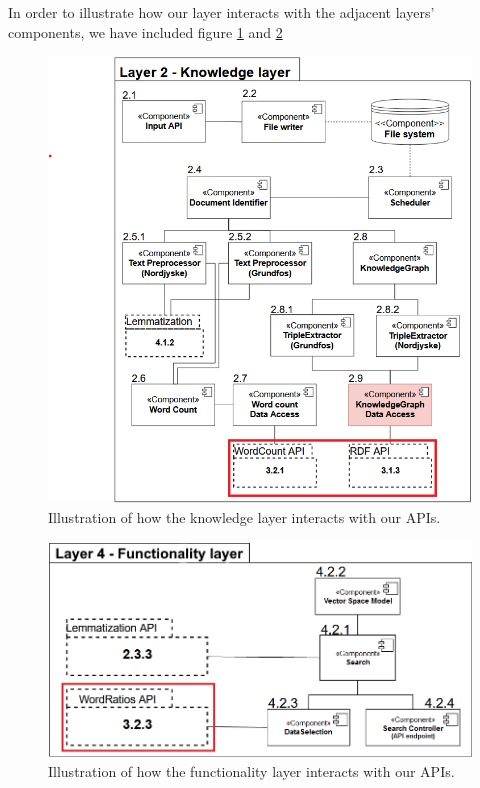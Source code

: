 In order to illustrate how our layer interacts with the adjacent layers' components, we have included figure \ref{PipelineLayer2} and \ref{PipelineLayer4} 

\begin{figure}[h!]
    \centering
    \includegraphics[scale=0.5]{Images/PipeLineLayer2.png}
    \caption{Illustration of how the knowledge layer interacts with our APIs.}
    \label{PipelineLayer2}
\end{figure}

\begin{figure}[h!]
    \centering
    \includegraphics[scale=0.4]{Images/PipeLineLayer4SE.png}
    \caption{Illustration of how the functionality layer interacts with our APIs.}
    \label{PipelineLayer4}
\end{figure}

